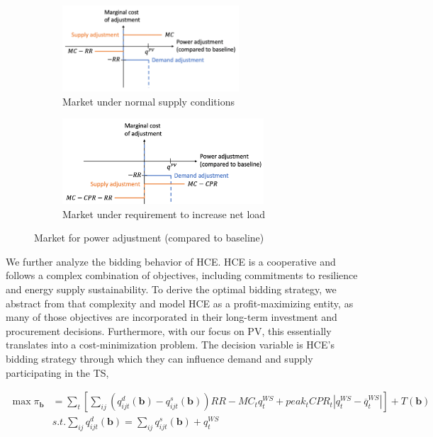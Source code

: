 \documentclass[12pt]{article}{Definitions/mdpi}
\begin{document}
\begin{figure}[t]\label{fig:baseline}
  \begin{subfigure}[t]{0.485\linewidth}
    \centering\includegraphics[height=3.2cm]{Market_power_normal_3.png}
    \caption{Market under normal supply conditions}
    \label{fig:lem_adjustment_normal}
  \end{subfigure}\hspace{0.5cm}
  \begin{subfigure}[t]{.485\linewidth}
    \centering\includegraphics[height=3.2cm]{Market_power_adjustment_3.png}
    \caption{Market under requirement to increase net load} 
    \label{fig:lem_adjustment}
  \end{subfigure}
\caption{Market for power adjustment (compared to baseline)}
\end{figure}

We further analyze the bidding behavior of HCE. HCE is a cooperative and follows a complex combination of objectives, including commitments to resilience and energy supply sustainability. To derive the optimal bidding strategy, we abstract from that complexity and model HCE as a profit-maximizing entity, as many of those objectives are incorporated in their long-term investment and procurement decisions. Furthermore, with our focus on PV, this essentially translates into a cost-minimization problem. The decision variable is HCE's bidding strategy through which they can influence demand and supply participating in the TS,

\begin{align}
    \max \pi_\mathbf{b} &= \sum_t [\sum_{ij} (q^d_{ijt}(\mathbf{b}) -  q^s_{ijt}(\mathbf{b})) RR - MC_t q^{WS}_t + peak_t CPR_t |q^{WS}_t - \overline{q}^{WS}_t| ] + T(\mathbf{b}) \nonumber \\
    & s.t. \sum_{ij} q^d_{ijt}(\mathbf{b}) =  \sum_{ij} q^s_{ijt}(\mathbf{b}) + q^{WS}_t
\end{align}
\end{document}
